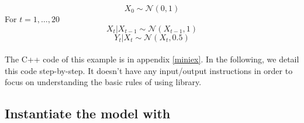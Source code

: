 $$
X_0\sim \mathcal{N}(0,1)
$$
For $t=1,\ldots,20$
$$
X_t|X_{t-1}\sim \mathcal{N}(X_{t-1},1)
$$
$$
Y_t|X_{t}\sim \mathcal{N}(X_{t},0.5)
$$


\paragraph{}
The C++ code of this example is in appendix \ref{miniex}. In the following, we detail this code step-by-step. It doesn't have any input/output instructions in order to focus on understanding the basic rules of using \biips{} library.


\subsection{Instantiate the model with \biips}

